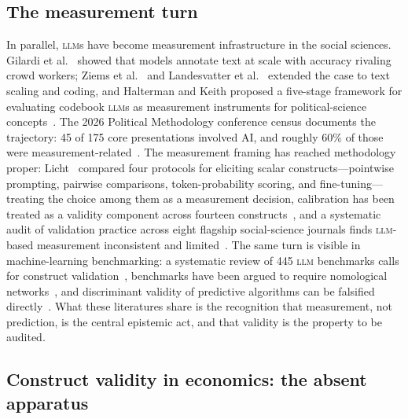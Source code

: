 \documentclass[10pt,letterpaper]{article}
\newcommand{\LLM}{\textsc{llm}}
\begin{document}
\subsection{The measurement turn}

In parallel, \LLM{}s have become measurement infrastructure in the social sciences. Gilardi et al.~\cite{gilardi2023} showed that models annotate text at scale with accuracy rivaling crowd workers; Ziems et al.~\cite{ziems2024} and Landesvatter et al.~\cite{landesvatter2026} extended the case to text scaling and coding, and Halterman and Keith proposed a five-stage framework for evaluating codebook \LLM{}s as measurement instruments for political-science concepts~\cite{halterman2024}. The 2026 Political Methodology conference census documents the trajectory: 45 of 175 core presentations involved AI, and roughly 60\% of those were measurement-related~\cite{hall2026}. The measurement framing has reached methodology proper: Licht~\cite{licht2025} compared four protocols for eliciting scalar constructs---pointwise prompting, pairwise comparisons, token-probability scoring, and fine-tuning---treating the choice among them as a measurement decision, calibration has been treated as a validity component across fourteen constructs~\cite{wangcalibration2026}, and a systematic audit of validation practice across eight flagship social-science journals finds \LLM{}-based measurement inconsistent and limited~\cite{desai2026}. The same turn is visible in machine-learning benchmarking: a systematic review of 445 \LLM{} benchmarks calls for construct validation~\cite{bean2025}, benchmarks have been argued to require nomological networks~\cite{freiesleben2026}, and discriminant validity of predictive algorithms can be falsified directly~\cite{coston2026}. What these literatures share is the recognition that measurement, not prediction, is the central epistemic act, and that validity is the property to be audited.

\subsection{Construct validity in economics: the absent apparatus}
\end{document}
